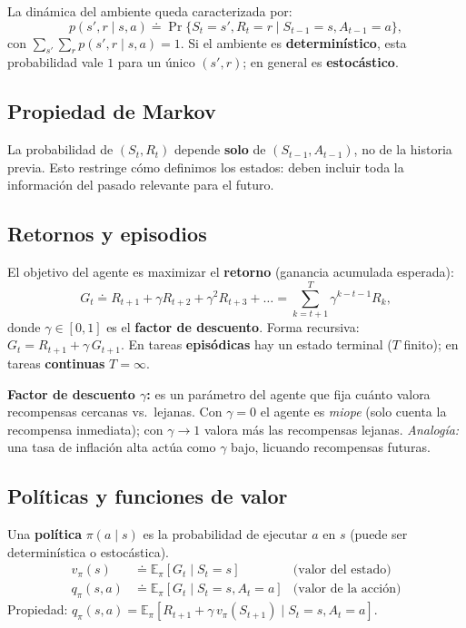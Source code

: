 \documentclass[11pt, a4paper]{article}
\begin{document}
La din\'amica del ambiente queda caracterizada por:
\[
    p(s', r \mid s, a) \doteq \Pr\{S_t = s', R_t = r \mid S_{t-1} = s, A_{t-1} = a\},
\]
con $\sum_{s'}\sum_r p(s', r \mid s, a) = 1$. Si el ambiente es \textbf{determin\'istico}, esta probabilidad vale $1$ para un \'unico $(s', r)$; en general es \textbf{estoc\'astico}.

\subsection{Propiedad de Markov}
La probabilidad de $(S_t, R_t)$ depende \textbf{solo} de $(S_{t-1}, A_{t-1})$, no de la historia previa. Esto restringe c\'omo definimos los estados: deben incluir toda la informaci\'on del pasado relevante para el futuro.

\subsection{Retornos y episodios}
El objetivo del agente es maximizar el \textbf{retorno} (ganancia acumulada esperada):
\[
    G_t \doteq R_{t+1} + \gamma R_{t+2} + \gamma^2 R_{t+3} + \dots = \sum_{k=t+1}^{T} \gamma^{k-t-1} R_k,
\]
donde $\gamma \in [0,1]$ es el \textbf{factor de descuento}. Forma recursiva: $G_t = R_{t+1} + \gamma\, G_{t+1}$. En tareas \textbf{episódicas} hay un estado terminal ($T$ finito); en tareas \textbf{continuas} $T = \infty$.

\textbf{Factor de descuento $\gamma$:} es un par\'ametro del agente que fija cu\'anto valora recompensas cercanas vs.\ lejanas. Con $\gamma = 0$ el agente es \emph{miope} (solo cuenta la recompensa inmediata); con $\gamma \to 1$ valora m\'as las recompensas lejanas. \emph{Analog\'ia:} una tasa de inflaci\'on alta act\'ua como $\gamma$ bajo, licuando recompensas futuras.

\subsection{Pol\'iticas y funciones de valor}
Una \textbf{pol\'itica} $\pi(a \mid s)$ es la probabilidad de ejecutar $a$ en $s$ (puede ser determin\'istica o estoc\'astica).
\begin{align*}
    v_\pi(s) &\doteq \mathbb{E}_\pi[G_t \mid S_t = s] & \text{(valor del estado)} \\
    q_\pi(s,a) &\doteq \mathbb{E}_\pi[G_t \mid S_t = s, A_t = a] & \text{(valor de la acci\'on)}
\end{align*}
Propiedad: $q_\pi(s,a) = \mathbb{E}_\pi[R_{t+1} + \gamma\, v_\pi(S_{t+1}) \mid S_t = s, A_t = a]$.
\end{document}
